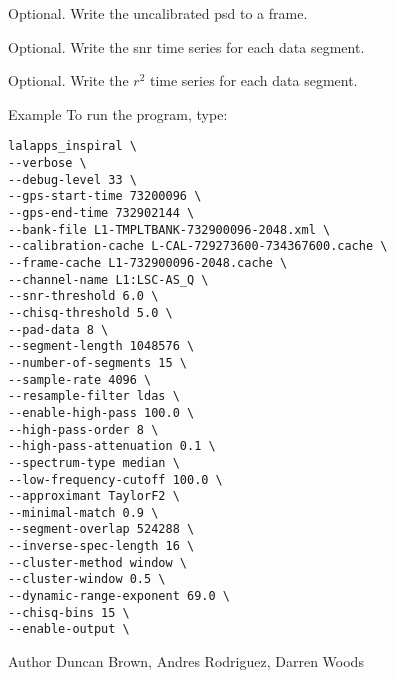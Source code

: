 \begin{entry}
\begin{entry}
\item[\option{--write-spectrum}] Optional. Write the uncalibrated psd to a 
frame.

\item[\option{--write-snrsq}] Optional. Write the snr time series for each 
data segment.

\item[\option{--write-chisq}] Optional. Write the $r^2$ time series for each 
data segment.


\end{entry}

\item[Example]
To run the program, type:
\begin{verbatim}
lalapps_inspiral \
--verbose \
--debug-level 33 \ 
--gps-start-time 73200096 \
--gps-end-time 732902144 \
--bank-file L1-TMPLTBANK-732900096-2048.xml \
--calibration-cache L-CAL-729273600-734367600.cache \ 
--frame-cache L1-732900096-2048.cache \
--channel-name L1:LSC-AS_Q \
--snr-threshold 6.0 \
--chisq-threshold 5.0 \
--pad-data 8 \
--segment-length 1048576 \
--number-of-segments 15 \
--sample-rate 4096 \
--resample-filter ldas \
--enable-high-pass 100.0 \ 
--high-pass-order 8 \
--high-pass-attenuation 0.1 \ 
--spectrum-type median \
--low-frequency-cutoff 100.0 \ 
--approximant TaylorF2 \
--minimal-match 0.9 \
--segment-overlap 524288 \
--inverse-spec-length 16 \
--cluster-method window \
--cluster-window 0.5 \
--dynamic-range-exponent 69.0 \ 
--chisq-bins 15 \
--enable-output \
\end{verbatim} 





\item[Author] Duncan Brown, Andres Rodriguez, Darren Woods 
\end{entry}
